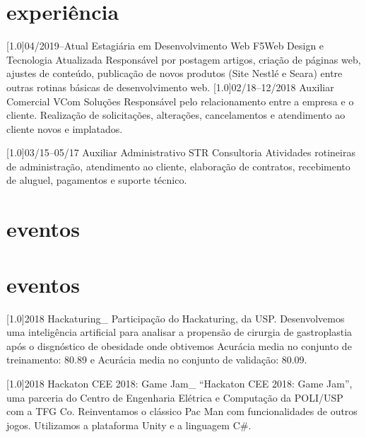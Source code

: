 \documentclass[espanol]{cv-style}     %
\begin{document}
  \section{experiência}
  \vspace{-0.2cm}
\begin{entrylist}
\entry
  {\scalebox{.8}[1.0]{04/2019--Atual}}
  {Estagiária em Desenvolvimento Web}
  {F5Web Design e Tecnologia Atualizada}
  {Responsável por postagem artigos, criação de páginas web, ajustes de conteúdo, publicação de novos produtos (Site Nestlé e Seara) entre outras rotinas básicas de desenvolvimento web.}
\entry
  {\scalebox{.8}[1.0]{02/18--12/2018}}
  {Auxiliar Comercial}
  {VCom Soluções}
  {Responsável pelo relacionamento entre a empresa e o cliente. Realização de solicitações, alterações, cancelamentos e atendimento ao cliente novos e implatados.}

\entry
  {\scalebox{.8}[1.0]{03/15--05/17}}
  {Auxiliar Administrativo}
  {STR Consultoria}
  {Atividades rotineiras de administração, atendimento ao cliente, elaboração de contratos, recebimento de aluguel, pagamentos e suporte técnico.}
 \vspace{-0.3cm}
\end{entrylist} 
\section{eventos}
 \vspace{-0.2cm}
\begin{entrylist}
\entry
  {\scalebox{.8}[1.0]{03/15--05/17}}
  {Auxiliar Administrativo}
  {STR Consultoria}
  {Atividades rotineiras de administração, atendimento ao cliente, elaboração de contratos, recebimento
  

\vspace{-0.3cm}
\end{entrylist} 
\section{eventos}
  \vspace{-0.2cm}
\begin{entrylist}
\entry
{\scalebox{.8}[1.0]{2018}}
{Hackaturing\_}
{}
{Participação do Hackaturing, da USP. Desenvolvemos uma inteligência artificial para analisar a propensão de cirurgia de gastroplastia após o disgnóstico de obesidade onde obtivemos Acurácia media no conjunto de treinamento: 80.89 e Acurácia media no conjunto de validação: 80.09.}

\entry
{\scalebox{.8}[1.0]{2018}}
{Hackaton CEE 2018: Game Jam\_}
{}
{“Hackaton CEE 2018: Game Jam”, uma parceria do Centro de Engenharia Elétrica e Computação da POLI/USP com a TFG Co. Reinventamos o clássico Pac Man com funcionalidades de outros jogos. Utilizamos a plataforma Unity e a linguagem C#.}

\end{entrylist}
\end{document}
